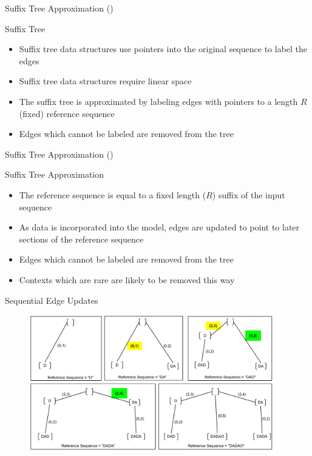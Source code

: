 \documentclass{beamer}
\begin{document}
\begin{frame}[t]{Suffix Tree Approximation (\citet{Bartlett2011})}

	\begin{block}{Suffix Tree}
		\begin{itemize}
           \item Suffix tree data structures use pointers into the original sequence to label the edges
			\item Suffix tree data structures require linear space
			\item The suffix tree is approximated by labeling edges with pointers to a length $R$ (fixed) reference sequence
			\item Edges which cannot be labeled are removed from the tree
		\end{itemize}
	\end{block}
	
\end{frame}

\begin{frame}[t]{Suffix Tree Approximation  (\citet{Bartlett2011})}
	
	\begin{block}{Suffix Tree Approximation}
			\begin{itemize}
				\item The reference sequence is equal to a fixed length ($R$) suffix of the input sequence
				\item As data is incorporated into the model, edges are updated to point to later sections of the reference sequence
				\item Edges which cannot be labeled are removed from the tree
            	\item Contexts which are rare are likely to be removed this way
			\end{itemize}
	\end{block}
		
\end{frame}

\begin{frame}[t]{Sequential Edge Updates}

   	\begin{figure}[t]
		\begin{center}
			\includegraphics[width = 11cm]{../figs/DADAO.pdf}
		\end{center}
	\end{figure}

\end{frame}
\end{document}
